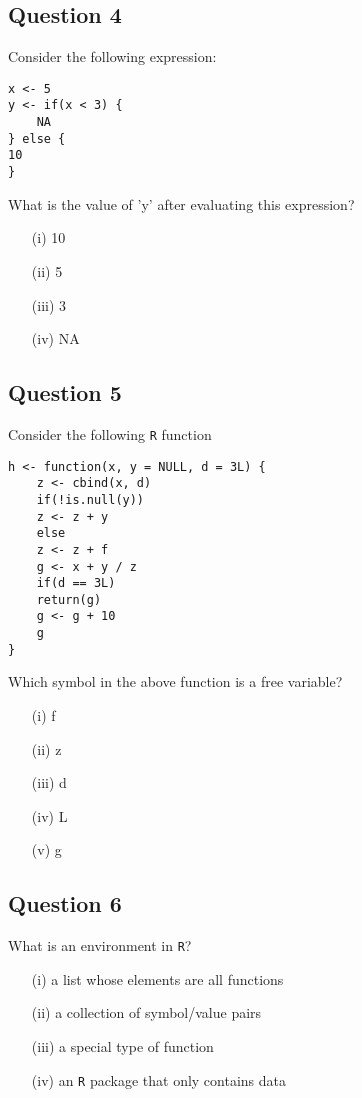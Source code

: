 \documentclass[]{article}
\begin{document}
\subsection*{Question 4}
Consider the following expression:
\begin{framed}
\begin{verbatim}
x <- 5
y <- if(x < 3) {
	NA
} else {
10
}
\end{verbatim}
\end{framed}
What is the value of 'y' after evaluating this expression?
\begin{itemize}
\item[(i)] 10 
\item[(ii)] 5
\item[(iii)] 3
\item[(iv)] NA
\end{itemize}

\newpage
\subsection*{Question 5}
Consider the following \texttt{R} function
\begin{framed}
\begin{verbatim}
h <- function(x, y = NULL, d = 3L) {
	z <- cbind(x, d)
	if(!is.null(y))
	z <- z + y
	else
	z <- z + f
	g <- x + y / z
	if(d == 3L)
	return(g)
	g <- g + 10
	g
}
\end{verbatim}
\end{framed}

Which symbol in the above function is a free variable?

\begin{itemize}
\item[(i)] f
\item[(ii)] z
\item[(iii)] d
\item[(iv)] L
\item[(v)] g
\end{itemize}

\newpage
\subsection*{Question 6}
What is an environment in \texttt{R}?
\begin{itemize}
	\item[(i)] a list whose elements are all functions
	\item[(ii)] a collection of symbol/value pairs
	\item[(iii)] a special type of function
	\item[(iv)] an \texttt{R} package that only contains data
\end{itemize}
\newpage
\end{document}
